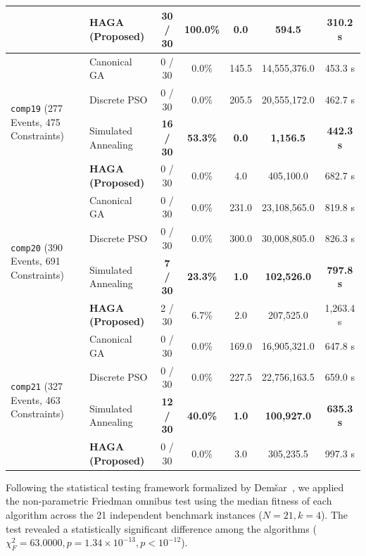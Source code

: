 \documentclass[journal]{IEEEtran}
\begin{document}
\begin{table}[!t]
{\begin{tabular}{ll c c c c c}
& \textbf{HAGA (Proposed)} & \textbf{30 / 30} & \textbf{100.0\%} & \textbf{0.0} & 594.5 & 310.2 s \\
\midrule
\multirow{4}{*}{\texttt{comp19} (277 Events, 475 Constraints)} 
& Canonical GA        & 0 / 30 & 0.0\%  & 145.5 & 14,555,376.0 & 453.3 s \\
& Discrete PSO        & 0 / 30 & 0.0\%  & 205.5 & 20,555,172.0 & 462.7 s \\
& Simulated Annealing & \textbf{16 / 30} & \textbf{53.3\%} & \textbf{0.0} & \textbf{1,156.5} & \textbf{442.3 s} \\
& \textbf{HAGA (Proposed)} & 0 / 30 & 0.0\%  & 4.0 & 405,100.0 & 682.7 s \\
\multirow{4}{*}{\texttt{comp20} (390 Events, 691 Constraints)} 
& Canonical GA        & 0 / 30 & 0.0\% & 231.0 & 23,108,565.0 & 819.8 s \\
& Discrete PSO        & 0 / 30 & 0.0\% & 300.0 & 30,008,805.0 & 826.3 s \\
& Simulated Annealing & \textbf{7 / 30} & \textbf{23.3\%} & \textbf{1.0} & \textbf{102,526.0} & \textbf{797.8 s} \\
& \textbf{HAGA (Proposed)} & 2 / 30 & 6.7\% & 2.0 & 207,525.0 & 1,263.4 s \\
\midrule
\multirow{4}{*}{\texttt{comp21} (327 Events, 463 Constraints)} 
& Canonical GA        & 0 / 30 & 0.0\% & 169.0 & 16,905,321.0 & 647.8 s \\
& Discrete PSO        & 0 / 30 & 0.0\% & 227.5 & 22,756,163.5 & 659.0 s \\
& Simulated Annealing & \textbf{12 / 30} & \textbf{40.0\%} & \textbf{1.0} & \textbf{100,927.0} & \textbf{635.3 s} \\
& \textbf{HAGA (Proposed)} & 0 / 30 & 0.0\% & 3.0 & 305,235.5 & 997.3 s \\
\bottomrule
\end{tabular}%
}\end{table}

Following the statistical testing framework formalized by Dem{\v{s}}ar~\cite{demsar2006statistical}, we applied the non-parametric Friedman omnibus test using the median fitness of each algorithm across the 21 independent benchmark instances ($N=21, k=4$). The test revealed a statistically significant difference among the algorithms ($\chi^2_F = 63.0000, p = 1.34 \times 10^{-13}, p < 10^{-12}$). 
\end{document}
